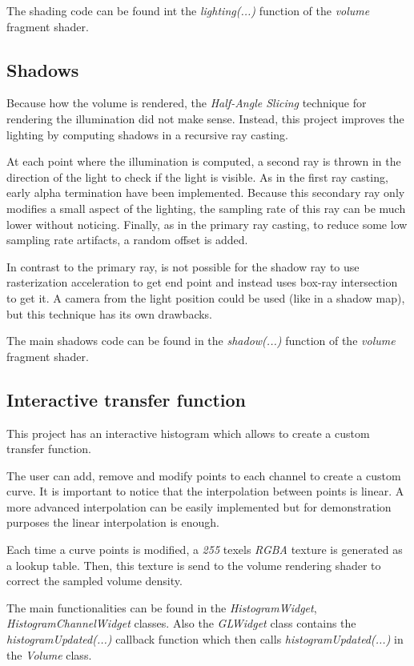 \documentclass{article}
\begin{document}
The shading code can be found int the \textit{lighting(...)} function of the \textit{volume} fragment shader.

\subsection*{Shadows}
Because how the volume is rendered, the \textit{Half-Angle Slicing} technique for rendering the illumination did not make sense. Instead, this project improves the lighting by computing shadows in a recursive ray casting.

At each point where the illumination is computed, a second ray is thrown in the direction of the light to check if the light is visible. As in the first ray casting, early alpha termination have been implemented. Because this secondary ray only modifies a small aspect of the lighting, the sampling rate of this ray can be much lower without noticing. Finally, as in the primary ray casting, to reduce some low sampling rate artifacts, a random offset is added.

In contrast to the primary ray, is not possible for the shadow ray to use rasterization acceleration to get end point and instead uses box-ray intersection to get it. A camera from the light position could be used (like in a shadow map), but this technique has its own drawbacks.

The main shadows code can be found in the \textit{shadow(...)} function of the \textit{volume} fragment shader.

\subsection*{Interactive transfer function}
This project has an interactive histogram which allows to create a custom transfer function.

The user can add, remove and modify points to each channel to create a custom curve. It is important to notice that the interpolation between points is linear. A more advanced interpolation can be easily implemented but for demonstration purposes the linear interpolation is enough.

Each time a curve points is modified, a \textit{255} texels \textit{RGBA} texture is generated as a lookup table. Then, this texture is send to the volume rendering shader to correct the sampled volume density.

The main functionalities can be found in the \textit{HistogramWidget}, \textit{HistogramChannelWidget} classes. Also the \textit{GLWidget} class contains the \textit{histogramUpdated(...)} callback function which then calls \textit{histogramUpdated(...)} in the \textit{Volume} class.
\end{document}

